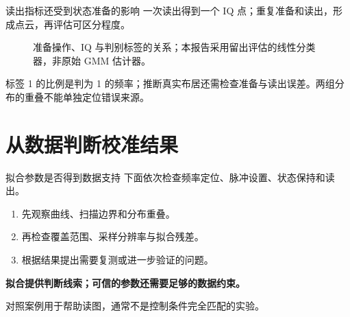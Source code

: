\documentclass[aspectratio=169,12pt,fontset=none]{ctexbeamer}
\newcommand{\src}[1]{\vfill{\fontsize{9}{11}\selectfont\color{Muted}#1\par}}
\begin{document}
\begin{frame}{读出指标还受到状态准备的影响}
 一次读出得到一个 IQ 点；重复准备和读出，形成点云，再评估可区分程度。
 \begin{figure}
 \centering
 \caption{准备操作、IQ 与判别标签的关系；本报告采用留出评估的线性分类器，非原始 GMM 估计器。}
 \label{fig-preparation-assignment}
 \end{figure}
 标签 1 的比例是判为 1 的频率；推断真实布居还需检查准备与读出误差。两组分布的重叠不能单独定位错误来源。
\end{frame}

\section[数据判断]{从数据判断校准结果}
\begin{frame}{拟合参数是否得到数据支持}
 下面依次检查频率定位、脉冲设置、状态保持和读出。
 \vspace{3mm}
 \begin{enumerate}
  \item 先观察曲线、扫描边界和分布重叠。
  \item 再检查覆盖范围、采样分辨率与拟合残差。
  \item 根据结果提出需要复测或进一步验证的问题。
 \end{enumerate}
 \vspace{3mm}
 \textbf{拟合提供判断线索；可信的参数还需要足够的数据约束。}
 \src{对照案例用于帮助读图，通常不是控制条件完全匹配的实验。}
\end{frame}


\end{document}
